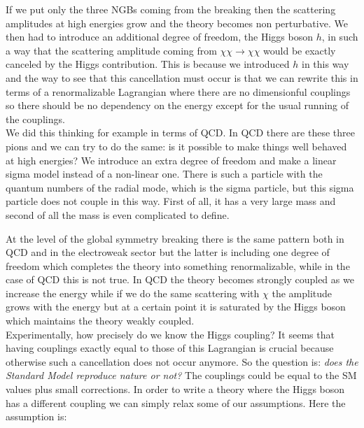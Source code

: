 \documentclass[../main.tex]{subfiles}
\begin{document}
\begin{kaobox}[frametitle=Remark on SU(2)$\times$SU(2) symmetry breaking]
If we put only the three NGBs coming from the breaking then the scattering amplitudes at high energies grow and the theory becomes non perturbative. We then had to introduce an additional degree of freedom, the Higgs boson $h$, in such a way that the scattering amplitude coming from $\chi\chi\to\chi\chi$ would be exactly canceled by the Higgs contribution. This is because we introduced $h$ in this way and the way to see that this cancellation must occur is that we can rewrite this in terms of a renormalizable Lagrangian where there are no dimensionful couplings so there should be no dependency on the energy except for the usual running of the couplings.\\
We did this thinking for example in terms of QCD. In QCD there are these three pions and we can try to do the same: is it possible to make things well behaved at high energies? We introduce an extra degree of freedom and make a linear sigma model instead of a non-linear one. There is such a particle with the quantum numbers of the radial mode, which is the sigma particle, but this sigma particle does not couple in this way. First of all, it has a very large mass and second of all the mass is even complicated to define.\\ 
\end{kaobox}
At the level of the global symmetry breaking there is the same pattern both in QCD and in the electroweak sector but the latter is including one degree of freedom which completes the theory into something renormalizable, while in the case of QCD this is not true. In QCD the theory becomes strongly coupled as we increase the energy while if we do the same scattering with $\chi$ the amplitude grows with the energy but at a certain point it is saturated by the Higgs boson which maintains the theory weakly coupled.\\
Experimentally, how precisely do we know the Higgs coupling? It seems that having couplings exactly equal to those of this Lagrangian is crucial because otherwise such a cancellation does not occur anymore. So the question is: \textit{does the Standard Model reproduce nature or not?} The couplings could be equal to the SM values plus small corrections. In order to write a theory where the Higgs boson has a different coupling we can simply relax some of our assumptions. Here the assumption is:
\end{document}
